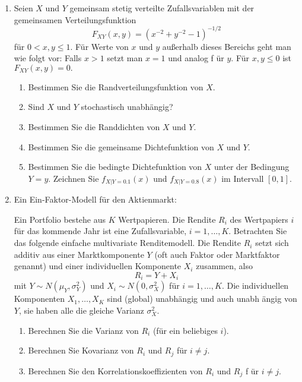 \begin{enumerate}
\item Seien $X$ und $Y$ gemeinsam stetig verteilte Zufallsvariablen mit
der gemeinsamen Verteilungsfunktion%
\begin{equation*}
F_{XY}(x,y)=\left( x^{-2}+y^{-2}-1\right) ^{-1/2}
\end{equation*}%
f\"{u}r $0<x,y\leq 1$. F\"{u}r Werte von $x$ und $y$ au\ss erhalb dieses
Bereichs geht man wie folgt vor: Falls $x>1$ setzt man $x=1$ und analog f%
\"{u}r $y$. F\"{u}r $x,y\leq 0$ ist $F_{XY}(x,y)=0.$
\begin{enumerate}
\item Bestimmen Sie die Randverteilungsfunktion von $X$.
\item Sind $X$ und $Y$ stochastisch unabh\"{a}ngig?
\item Bestimmen Sie die Randdichten von $X$ und $Y$.
\item Bestimmen Sie die gemeinsame Dichtefunktion von $X$ und $Y$.
\item Bestimmen Sie die bedingte Dichtefunktion von $X$ unter der Bedingung $%
Y=y$. Zeich\-nen Sie $f_{X|Y=0.1}(x)$ und $f_{X|Y=0.8}(x)$ im Intervall $%
[0,1]$.
\end{enumerate}

\item Ein Ein-Faktor-Modell f\"{u}r den Aktienmarkt:

Ein Portfolio bestehe aus $K$ Wertpapieren. Die Rendite $R_{i}$ des
Wertpapiers $i$ f\"{u}r das kommende Jahr ist eine Zufallsvariable, $%
i=1,\ldots ,K$. Betrachten Sie das folgende einfache multivariate
Renditemodell. Die Rendite $R_{i}$ setzt sich additiv aus einer
Marktkomponente $Y$ (oft auch Faktor oder Marktfaktor genannt) und einer
individuellen Komponente $X_{i}$ zusammen, also%
\begin{equation*}
R_{i}=Y+X_{i}
\end{equation*}%
mit $Y\sim N\left( \mu _{Y},\sigma _{Y}^{2}\right) $ und $X_{i}\sim N\left(
0,\sigma _{X}^{2}\right) $ f\"{u}r $i=1,\ldots ,K$. Die individuellen
Komponenten $X_{1},\ldots ,X_{K}$ sind (global) unabh\"{a}ngig und auch unabh%
\"{a}ngig von $Y$, sie haben alle die gleiche Varianz $\sigma _{X}^{2}.$
\begin{enumerate}
\item Berechnen Sie die Varianz von $R_{i}$ (f\"{u}r ein beliebiges $i$).
\item Berechnen Sie Kovarianz von $R_{i}$ und $R_{j}$ f\"{u}r $i\neq j$.
\item Berechnen Sie den Korrelationskoeffizienten von $R_{i}$ und $R_{j}$ f%
\"{u}r $i\neq j$.
\end{enumerate}


\end{enumerate}

